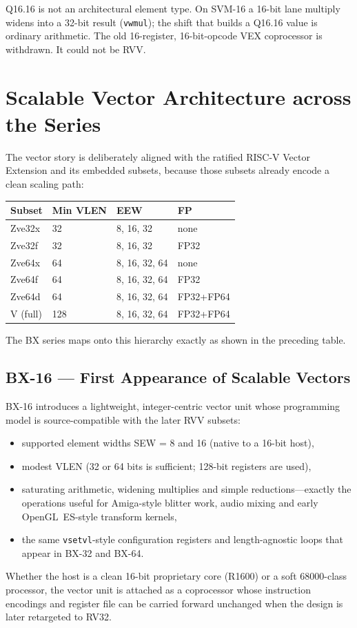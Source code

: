 \documentclass[11pt,a4paper]{article}
\begin{document}
Q16.16 is not an architectural element type. On SVM-16 a 16-bit lane multiply widens into a 32-bit result (\texttt{vwmul}); the shift that builds a Q16.16 value is ordinary arithmetic. The old 16-register, 16-bit-opcode VEX coprocessor is withdrawn. It could not be RVV.

\section{Scalable Vector Architecture across the Series}

The vector story is deliberately aligned with the ratified RISC-V Vector Extension and its embedded subsets, because those subsets already encode a clean scaling path:

\begin{center}
\begin{tabular}{@{}llll@{}}
\toprule
\textbf{Subset} & \textbf{Min VLEN} & \textbf{EEW} & \textbf{FP} \\
\midrule
Zve32x  & 32  & 8, 16, 32     & none \\
Zve32f  & 32  & 8, 16, 32     & FP32 \\
Zve64x  & 64  & 8, 16, 32, 64 & none \\
Zve64f  & 64  & 8, 16, 32, 64 & FP32 \\
Zve64d  & 64  & 8, 16, 32, 64 & FP32+FP64 \\
V (full)& 128 & 8, 16, 32, 64 & FP32+FP64 \\
\bottomrule
\end{tabular}
\end{center}

The BX series maps onto this hierarchy exactly as shown in the preceding table.

\subsection{BX-16 --- First Appearance of Scalable Vectors}

BX-16 introduces a lightweight, integer-centric vector unit whose programming model is source-compatible with the later RVV subsets:
\begin{itemize}[leftmargin=1.5em]
  \item supported element widths SEW = 8 and 16 (native to a 16-bit host),
  \item modest VLEN (32 or 64 bits is sufficient; 128-bit registers are used),
  \item saturating arithmetic, widening multiplies and simple reductions---exactly the operations useful for Amiga-style blitter work, audio mixing and early OpenGL~ES-style transform kernels,
  \item the same \texttt{vsetvl}-style configuration registers and length-agnostic loops that appear in BX-32 and BX-64.
\end{itemize}
Whether the host is a clean 16-bit proprietary core (R1600) or a soft 68000-class processor, the vector unit is attached as a coprocessor whose instruction encodings and register file can be carried forward unchanged when the design is later retargeted to RV32.
\end{document}
